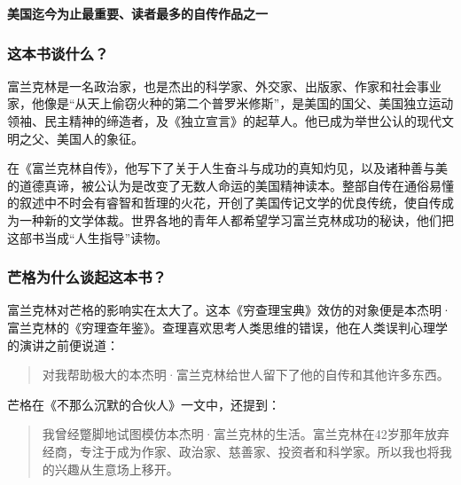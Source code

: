 \cleardoublepage
{}


\begin{BookSummaryBox}
\textbf{美国迄今为止最重要、读者最多的自传作品之一}
\par
\end{BookSummaryBox}

\subsubsection*{这本书谈什么？}

富兰克林是一名政治家，也是杰出的科学家、外交家、出版家、作家和社会事业家，他像是“从天上偷窃火种的第二个普罗米修斯”，是美国的国父、美国独立运动领袖、民主精神的缔造者，及《独立宣言》的起草人。他已成为举世公认的现代文明之父、美国人的象征。
\par

在《富兰克林自传》，他写下了关于人生奋斗与成功的真知灼见，以及诸种善与美的道德真谛，被公认为是改变了无数人命运的美国精神读本。整部自传在通俗易懂的叙述中不时会有睿智和哲理的火花，开创了美国传记文学的优良传统，使自传成为一种新的文学体裁。世界各地的青年人都希望学习富兰克林成功的秘诀，他们把这部书当成“人生指导”读物。
\par

\subsubsection*{芒格为什么谈起这本书？}

富兰克林对芒格的影响实在太大了。这本《穷查理宝典》效仿的对象便是本杰明·富兰克林的《穷理查年鉴》。查理喜欢思考人类思维的错误，他在人类误判心理学的演讲之前便说道：
\par

\begin{quotation}
对我帮助极大的本杰明·富兰克林给世人留下了他的自传和其他许多东西。
\par
\end{quotation}

芒格在《不那么沉默的合伙人》一文中，还提到：
\par

\begin{quotation}
我曾经蹩脚地试图模仿本杰明·富兰克林的生活。富兰克林在42岁那年放弃经商，专注于成为作家、政治家、慈善家、投资者和科学家。所以我也将我的兴趣从生意场上移开。
\par
\end{quotation}

